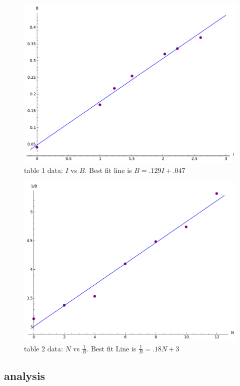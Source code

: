 \documentclass[12pt]{article}
\begin{document}
	\begin{figure}[hp]
	 \centering
	 \includegraphics[scale = .85]{plot1}
	 \caption*{table 1 data: $I$ vs $B$. Best fit line is $B = .129I + .047$}
	\end{figure} 

	\begin{figure}[hp]
	 \centering
	 \includegraphics[scale = .85]{plot2}
	 \caption*{table 2 data: $N$ vs $\frac{1}{B}$. Best fit Line is $ \frac{1}{B} = .18N + 3 $}
	\end{figure}
	\FloatBarrier

\subsection*{analysis}
\end{document}
